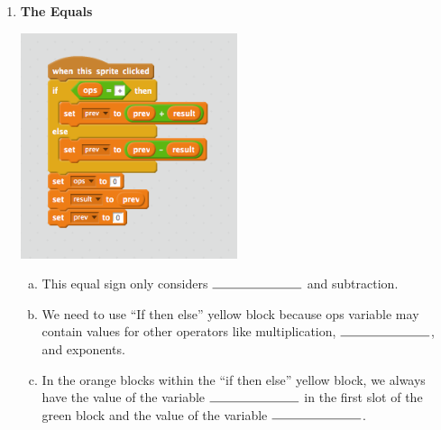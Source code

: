 \documentclass[11pt]{article}
\begin{document}
\noindent\makebox[\linewidth]{\rule{\paperwidth}{0.4pt}}
\begin{enumerate}
\item \textbf{The Equals}
\begin{center}
  \includegraphics[width=2.5in]{equals.png}
 \end{center}
\begin{enumerate}[a.]
\item This equal sign only considers $\rule{2.5cm}{0.15mm}$ and subtraction.
\item We need to use ``If then else'' yellow block because ops variable may contain values for other operators like multiplication, $\rule{2.5cm}{0.15mm}$, and exponents.
\item In the orange blocks within the ``if then else'' yellow block, we always have the value of the variable $\rule{2.5cm}{0.15mm}$ in the first slot of the green block and the value of the variable $\rule{2.5cm}{0.15mm}$.
\end{enumerate}
\end{enumerate}
\end{document}
